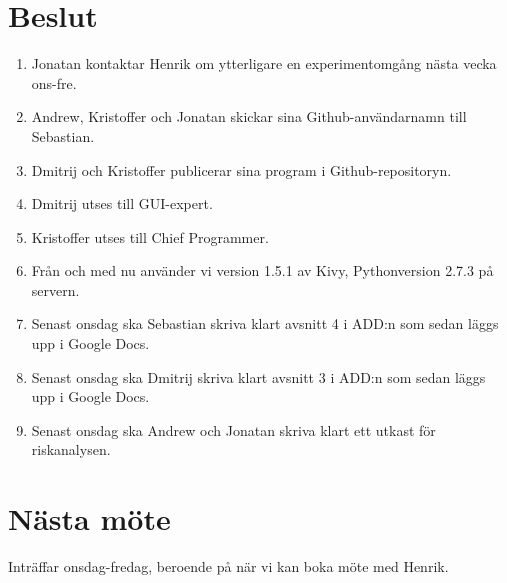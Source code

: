 \documentclass[a4paper,12pt]{article}
\begin{document}
\section{Beslut}
\begin{enumerate}
\item Jonatan kontaktar Henrik om ytterligare en experimentomgång nästa vecka ons-fre.
\item Andrew, Kristoffer och Jonatan skickar sina Github-användarnamn till Sebastian.
\item Dmitrij och Kristoffer publicerar sina program i Github-repositoryn.
\item Dmitrij utses till GUI-expert.
\item Kristoffer utses till Chief Programmer.
\item Från och med nu använder vi version 1.5.1 av Kivy, Pythonversion 2.7.3 på servern.
\item Senast onsdag ska Sebastian skriva klart avsnitt 4 i ADD:n som sedan läggs upp i Google Docs.
\item Senast onsdag ska Dmitrij skriva klart avsnitt 3 i ADD:n som sedan läggs upp i Google Docs.
\item Senast onsdag ska Andrew och Jonatan skriva klart ett utkast för riskanalysen.
\end{enumerate}

\section{Nästa möte}
Inträffar onsdag-fredag, beroende på när vi kan boka möte med Henrik.
\end{document}
